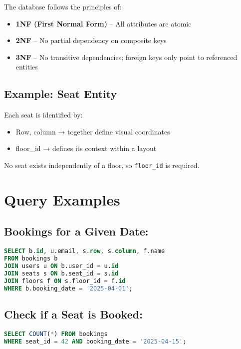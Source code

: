 \documentclass[12pt,a4paper]{report}
\begin{document}
The database follows the principles of:
\begin{itemize}
    \item \textbf{1NF (First Normal Form)} – All attributes are atomic
    \item \textbf{2NF} – No partial dependency on composite keys
    \item \textbf{3NF} – No transitive dependencies; foreign keys only point to referenced entities
\end{itemize}

\subsection*{Example: Seat Entity}

Each seat is identified by:
\begin{itemize}
    \item Row, column → together define visual coordinates
    \item floor\_id → defines its context within a layout
\end{itemize}

No seat exists independently of a floor, so \verb|floor_id| is required.

\section{Query Examples}

\subsection*{Bookings for a Given Date:}

\begin{lstlisting}[language=SQL]
SELECT b.id, u.email, s.row, s.column, f.name
FROM bookings b
JOIN users u ON b.user_id = u.id
JOIN seats s ON b.seat_id = s.id
JOIN floors f ON s.floor_id = f.id
WHERE b.booking_date = '2025-04-01';
\end{lstlisting}

\subsection*{Check if a Seat is Booked:}

\begin{lstlisting}[language=SQL]
SELECT COUNT(*) FROM bookings
WHERE seat_id = 42 AND booking_date = '2025-04-15';
\end{lstlisting}
\end{document}
